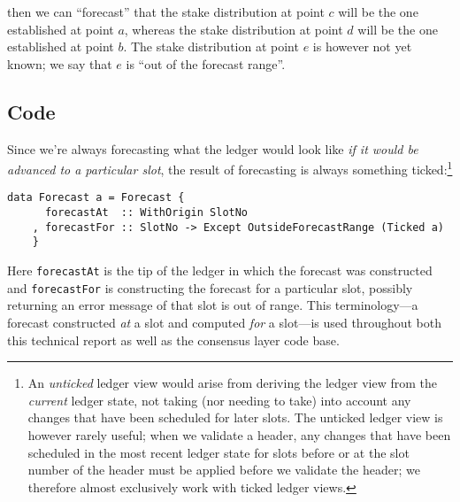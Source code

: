 \begin{center}
\end{center}
%
then we can ``forecast'' that the stake distribution at point $c$ will be the one
established at point $a$, whereas the stake distribution at point $d$ will be the
one established at point $b$. The stake distribution at point $e$ is however not
yet known; we say that $e$ is ``out of the forecast range''.

\subsection{Code}

Since we're always forecasting what the ledger would look like \emph{if it would
be advanced to a particular slot}, the result of forecasting is always something
ticked:\footnote{An \emph{unticked} ledger view would arise from deriving the
ledger view from the \emph{current} ledger state, not taking (nor needing to
take) into account any changes that have been scheduled for later slots. The
unticked ledger view is however rarely useful; when we validate a header, any
changes that have been scheduled in the most recent ledger state for slots
before or at the slot number of the header must be applied before we validate
the header; we therefore almost exclusively work with ticked ledger views.}
%
\begin{lstlisting}
data Forecast a = Forecast {
      forecastAt  :: WithOrigin SlotNo
    , forecastFor :: SlotNo -> Except OutsideForecastRange (Ticked a)
    }
\end{lstlisting}
%
Here \lstinline!forecastAt! is the tip of the ledger in which the forecast was
constructed and \lstinline!forecastFor! is constructing the forecast for a
particular slot, possibly returning an error message of that slot is out of
range. This terminology---a forecast constructed \emph{at} a slot
and computed \emph{for} a slot---is used throughout both this technical report
as well as the consensus layer code base.


